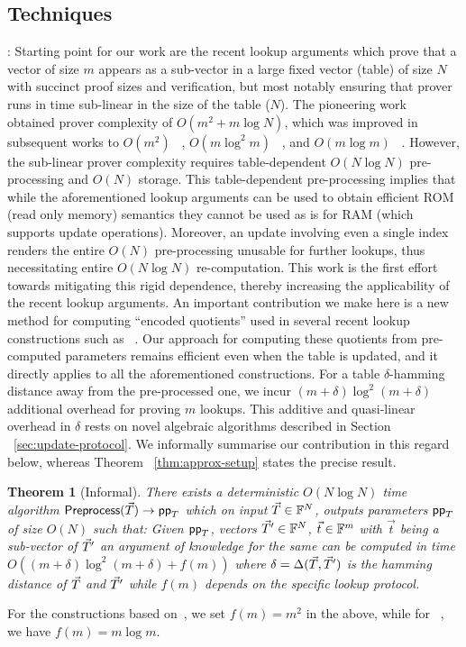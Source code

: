\documentclass[sigconf]{acmart}
\newtheorem{theorem}{Theorem}[section]
\begin{document}
\subsection{Techniques}\label{subsec:techniques}
: Starting point for our work are the recent lookup arguments which prove
that a vector of size $m$ appears as
a sub-vector in a large fixed vector (table) of size $N$ with succinct proof sizes and verification, but most notably
ensuring that prover runs in time sub-linear in the size of the table ($N$). The pioneering work ~\cite{CCS:ZBKMNS22}
obtained prover complexity of $O(m^2+m\log N)$, which was improved in subsequent works to $O(m^2)$ ~\cite{EPRINT:PosKat22},
$O(m\log^2 m)$ ~\cite{EPRINT:ZGKMR22}, and $O(m\log m)$ ~\cite{EPRINT:EagFioGab22}. However, the sub-linear prover
complexity requires table-dependent $O(N\log N)$ pre-processing and $O(N)$ storage. This table-dependent
pre-processing implies that while
the aforementioned lookup arguments can be used to obtain efficient ROM (read only memory) semantics
they cannot be used as is for RAM (which supports update operations).
Moreover, an update involving even a single
index renders the entire $O(N)$ pre-processing unusable for further lookups,
thus necessitating entire $O(N\log N)$ re-computation. This work is the first effort towards
mitigating this rigid dependence, thereby increasing the applicability of the recent lookup arguments.
An important contribution we make here is a new method for computing ``encoded quotients'' used in several
recent lookup constructions such as ~\cite{CCS:ZBKMNS22,EPRINT:PosKat22,EPRINT:EagFioGab22}.
Our approach for computing these quotients from pre-computed parameters remains efficient even when
the table is updated, and it directly applies to all the aforementioned constructions.
For a table $\delta$-hamming distance away from the pre-processed one, we incur
$(m+\delta)\log^2(m+\delta)$ additional overhead for proving $m$ lookups. This additive and quasi-linear
overhead in $\delta$ rests on novel algebraic algorithms described in Section ~\ref{sec:update-protocol}.
We informally summarise our contribution in this regard below, whereas Theorem ~\ref{thm:approx-setup}
states the precise result.
\begin{theorem}[Informal]\label{thm:pre-process}
	There exists a deterministic $O(N\log N)$ time algorithm $\textsf{Preprocess}(\vec{T})\rightarrow \mathsf{pp}_T$
	which on input $\vec{T}\in \mathbb{F}^N$, outputs parameters $\mathsf{pp}_T$ of size $O(N)$ such
	that: Given $\mathsf{pp}_T$, vectors $\vec{T}'\in \mathbb{F}^N$, $\vec{t}\in \mathbb{F}^m$ with $\vec{t}$ being a sub-vector of $\vec{T}'$
	an argument of knowledge for the same can be computed in time
	$O((m+\delta)\log^2 (m+\delta) + f(m))$ where $\delta=\Delta(\vec{T}, \vec{T}')$
	is the hamming distance of $\vec{T}$ and $\vec{T}'$ while $f(m)$ depends on the specific lookup protocol.
\end{theorem}
For the constructions  based on~\cite{CCS:ZBKMNS22,EPRINT:PosKat22}, we set $f(m)=m^2$ in the above,
while for ~\cite{EPRINT:EagFioGab22}, we have $f(m)=m\log m$.\smallskip
\end{document}

